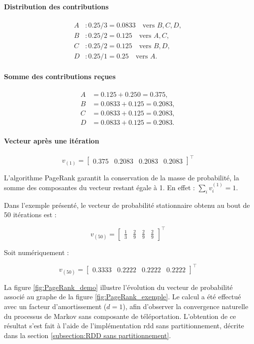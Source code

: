 \documentclass[conference]{IEEEtran}
\begin{document}
\paragraph{Distribution des contributions}
\[
\begin{aligned}
A &: 0.25/3 = 0.0833 \quad \text{vers } B, C, D,\\
B &: 0.25/2 = 0.125 \quad \text{vers } A, C,\\
C &: 0.25/2 = 0.125 \quad \text{vers } B, D,\\
D &: 0.25/1 = 0.25  \quad \text{vers } A.
\end{aligned}
\]

\paragraph{Somme des contributions reçues}
\[
\begin{aligned}
A &= 0.125 + 0.250 = 0.375,\\
B &= 0.0833 + 0.125 = 0.2083,\\
C &= 0.0833 + 0.125 = 0.2083,\\
D &= 0.0833 + 0.125 = 0.2083.
\end{aligned}
\]

\paragraph{Vecteur après une itération}
\[
v_{(1)} =
\begin{bmatrix}
0.375 & 0.2083 & 0.2083 & 0.2083
\end{bmatrix}^{\top}
\]

L'algorithme PageRank garantit la conservation de la masse de probabilité, la somme des composantes du vecteur restant égale à 1. En effet : $\sum\limits_i v^{(1)}_i = 1$.

Dans l'exemple présenté, le vecteur de probabilité stationnaire obtenu  au bout de 50 itérations est :

\[
v_{(50)} =
\begin{bmatrix}
\frac{1}{3} & \frac{2}{9} & \frac{2}{9} & \frac{2}{9}
\end{bmatrix}^{\top}
\]

Soit numériquement :

\[
v_{(50)} =
\begin{bmatrix}
0.3333 & 0.2222 & 0.2222 & 0.2222
\end{bmatrix}^{\top}
\]


La figure \ref{fig:PageRank_demo} illustre l'évolution du vecteur de probabilité associé au graphe de la figure \ref{fig:PageRank_exemple}.
Le calcul a été effectué avec un facteur d'amortissement ($d=1$), afin d'observer la convergence naturelle du processus de Markov sans composante de téléportation.
L'obtention de ce résultat s'est fait à l'aide de l'implémentation \gls{rdd} sans partitionnement, décrite dans la section \ref{subsection:RDD sans partitionnement}.
\end{document}
